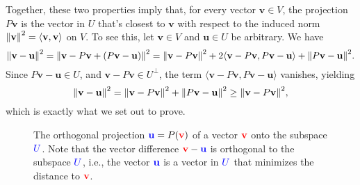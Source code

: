 Together, these two properties imply that, for every vector $\mathbf{v} \in V$, the projection $P \mathbf{v}$ is the vector in $U$ that's closest to $\mathbf{v}$ with respect to the induced norm $\norm{\mathbf{v}}^2 = \langle \mathbf{v}, \mathbf{v} \rangle$ on $V$. To see this, let $\mathbf{v} \in V$ and $\mathbf{u} \in U$ be arbitrary. We have
\[
    \norm{\mathbf{v} - \mathbf{u}}^2  = \norm{ \mathbf{v} - P \mathbf{v} + (P \mathbf{v} - \mathbf{u})}^2 = \norm{\mathbf{v} - P \mathbf{v}}^2 + 2 \langle \mathbf{v} - P \mathbf{v}, P \mathbf{v} - \mathbf{u} \rangle + \norm{P \mathbf{v} - \mathbf{u}}^2.
\]
Since $P \mathbf{v} - \mathbf{u} \in U$, and $\mathbf{v} - P \mathbf{v} \in U^{\bot}$, the term $\langle \mathbf{v} - P \mathbf{v}, P \mathbf{v} - \mathbf{u} \rangle$ vanishes, yielding
\[
    \norm{\mathbf{v} - \mathbf{u}}^2  = \norm{\mathbf{v} - P \mathbf{v}}^2 + \norm{P \mathbf{v} - \mathbf{u}}^2 \geq \norm{\mathbf{v} - P \mathbf{v}}^2,
\]
which is exactly what we set out to prove.

\begin{figure}
    \centering
    \caption{%
         The orthogonal projection ${\color{blue}\mathbf{u}} = P({\color{red}\mathbf{v}})$ of a vector ${\color{red}\mathbf{v}}$ onto the subspace ${\color{blue}U}$. Note that the vector difference ${\color{red}\mathbf{v}} - {\color{blue}\mathbf{u}}$ is orthogonal to the subspace ${\color{blue}U}$, i.e., the vector ${\color{blue}\mathbf{u}}$ is a vector in ${\color{blue}U}$ that minimizes the distance to ${\color{red}\mathbf{v}}$.
    }
    \label{fig: orthogonal projection}
\end{figure}

